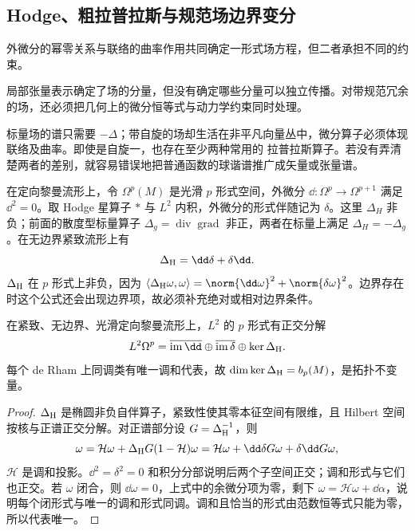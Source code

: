\subsection{Hodge、粗拉普拉斯与规范场边界变分}

外微分的幂零关系与联络的曲率作用共同确定一形式场方程，但二者承担不同的约束。

局部张量表示确定了场的分量，但没有确定哪些分量可以独立传播。对带规范冗余的场，还必须把几何上的微分恒等式与动力学约束同时处理。

标量场的谱只需要 $-\Delta$；带自旋的场却生活在非平凡向量丛中，微分算子必须体现联络及曲率。即使是自旋一，也存在至少两种常用的 拉普拉斯算子。若没有弄清楚两者的差别，就容易错误地把普通函数的球谐谱推广成矢量或张量谱。

在定向黎曼流形上，令 $\Omega^p(M)$ 是光滑 $p$ 形式空间，外微分 $\dd:\Omega^p\to\Omega^{p+1}$ 满足 $\dd^2=0$。取 Hodge 星算子 $*$ 与 $L^2$ 内积，外微分的形式伴随记为 $\delta$。这里 $\Delta_H$ 非负；前面的散度型标量算子 $\Delta_g=\operatorname{div}\operatorname{grad}$ 非正，两者在标量上满足 $\Delta_H=-\Delta_g$。在无边界紧致流形上有
\begin{equation}\label{eq:ghs-hodge-laplacian}
 \Delta_{\rm H}=\dd\delta+\delta\dd.
\end{equation}
$\Delta_{\rm H}$ 在 $p$ 形式上非负，因为
$\langle\Delta_{\rm H}\omega,\omega\rangle
 =\norm{\dd\omega}^2+\norm{\delta\omega}^2$。边界存在时这个公式还会出现边界项，故必须补充绝对或相对边界条件。

\begin{theorem}[Hodge 分解]
\label{thm:ghs-hodge-decomposition}
在紧致、无边界、光滑定向黎曼流形上，$L^2$ 的 $p$ 形式有正交分解
\begin{equation}\label{eq:ghs-hodge-direct-sum}
 L^2\Omega^p=\overline{\operatorname{im}\dd}
 \oplus\overline{\operatorname{im}\delta}\oplus\ker\Delta_{\rm H}.
\end{equation}
每个 de Rham 上同调类有唯一调和代表，故 $\dim\ker\Delta_{\rm H}=b_p(M)$，是拓扑不变量。
\end{theorem}
\begin{proof}
$\Delta_{\rm H}$ 是椭圆非负自伴算子，紧致性使其零本征空间有限维，且 Hilbert 空间按核与正谱正交分解。对正谱部分设 $G=\Delta_{\rm H}^{-1}$，则
\[
 \omega=\mathcal H\omega+\Delta_{\rm H}G(1-\mathcal H)\omega
 =\mathcal H\omega+\dd\delta G\omega+\delta\dd G\omega,
\]
$\mathcal H$ 是调和投影。$\dd^2=\delta^2=0$ 和积分分部说明后两个子空间正交；调和形式与它们也正交。若 $\omega$ 闭合，则 $\dd\omega=0$，上式中的余微分项为零，剩下 $\omega=\mathcal H\omega+\dd\alpha$，说明每个闭形式与唯一的调和形式同调。调和且恰当的形式由范数恒等式只能为零，所以代表唯一。
\end{proof}

